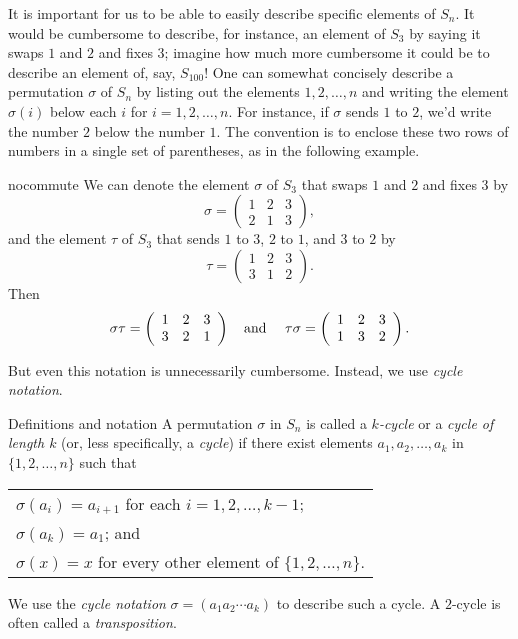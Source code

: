 It is important for us to be able to easily describe specific elements of $S_n$.  It would be cumbersome to describe, for instance, an element of $S_3$ by saying it swaps $1$ and $2$ and fixes $3$; imagine how much more cumbersome it could be to describe an element of, say, $S_{100}$!  One can somewhat concisely describe a permutation $\sigma$ of $S_n$ by listing out the elements $1,2,\ldots,n$ and writing the element $\sigma(i)$ below each $i$ for $i=1,2,\ldots, n$.
For instance, if $\sigma$ sends $1$ to $2$, we'd write the number $2$ below the number $1$.  The convention is to enclose these two rows of numbers in a single set of parentheses, as in the following example.


\begin{example}{nocommute} We can denote the element $\sigma$ of $S_3$ that swaps $1$ and $2$ and fixes $3$ by
$$\sigma = \left(\begin{array}{ccc}1&2&3\\ 2&1&3 \end{array}\right),$$ and the element $\tau$ of $S_3$ that sends $1$ to $3$, $2$ to $1$, and $3$ to $2$ by
$$\tau =\left(\begin{array}{ccc}1&2&3\\ 3&1&2 \end{array}\right).$$ Then $$\sigma\tau = \left(\begin{array}{ccc}1&2&3\\ 3&2&1 \end{array}\right) \mbox{\quad and \quad}
\tau\sigma = \left(\begin{array}{ccc}1&2&3\\ 1&3&2 \end{array}\right) . $$
\end{example}

 But even this notation is unnecessarily cumbersome. Instead, we
use \textit{cycle notation}.

\begin{df}{Definitions and notation} A permutation $\sigma$ in $S_n$ is called a \textit{$k$-cycle} or a \textit{cycle of length $k$} (or, less
specifically, a \textit{cycle}) if there exist elements $a_1,
a_2,\ldots, a_k$ in $\{1,2,\ldots,n\}$ such that
\begin{center}
\begin{tabular}{l}$\sigma(a_i)=a_{i+1}$ for each $i=1,2,\ldots, k-1$;\\
$\sigma(a_k)=a_1$; and\\
$\sigma(x)=x$ for every other element of $\{1,2,\ldots, n\}$.\end{tabular}\end{center}
We use the \textit{cycle notation} $\sigma = (a_1 a_2 \cdots a_k)$ to describe such a cycle. A $2$-cycle is often called a \textit{transposition}.\end{df}



